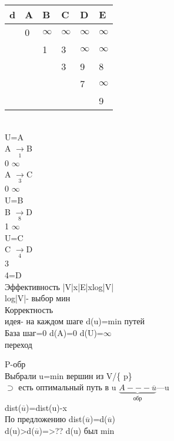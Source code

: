 \documentclass{article}
\begin{document}
\begin{tabular}{l l l l l l}
 d& A &B&C&D&E\\
\hline
& 0 & $\infty$ &$\infty$&$\infty$ &$\infty$ \\
&  & 1& 3&$\infty$ &$\infty$ \\
&  & &3&9&8\\
&  & & &7&$\infty$\\
&  & & & &9\\
\end{tabular}\\
U=A\\
A $\xrightarrow[1]{}$B\\
0 \quad $\infty$ \\
A $\xrightarrow[3]{}$C\\
0 \quad $\infty$ \\
U=B\\
B $\xrightarrow[8]{}$D\\
1 \quad $\infty$ \\
U=C\\
C $\xrightarrow[4]{}$D\\
3  \\
4=D\\
Эффективность |V|x|E|xlog|V|\\
log|V|- выбор мин\\
Корректность\\
идея- на каждом шаге d(u)=min путей\\
База шаг=0 d(A)=0 d(U)=$\infty$\\
переход\\
 P-обр\\
Выбрали u=min вершин из V/\{ p\}\\
$\supset$ есть оптимальный путь в u $\underbrace{A---\overline{u}}_{\textrm{обр}}$---u\\
dist($\overline{u}$)=dist(u)-x\\
По предложению dist($\overline{u}$)=d($\overline{u}$)\\
d(u)>d($\overline{u}$)=>?? d(u) был min\\
\\
\end{document}
